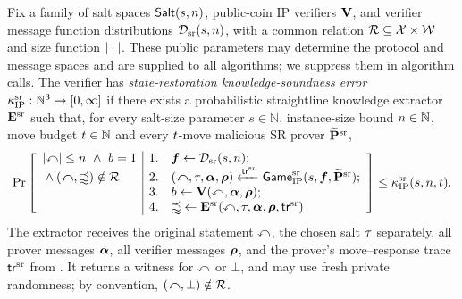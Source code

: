 \begin{definition}
  \label{def:sr_knowledge_soundness}
  Fix a family of salt spaces \(\mathsf{Salt}(s,n)\), public-coin IP verifiers \(\mathbf{V}\), and verifier message function distributions \(\mathcal{D}_{\mathrm{sr}}(s,n)\), with a common relation \(\mathcal{R}\subseteq\mathcal X\times\mathcal W\) and size function \(|\cdot|\). These public parameters may determine the protocol and message spaces and are supplied to all algorithms; we suppress them in algorithm calls. The verifier has \emph{state-restoration knowledge-soundness error} \(\kappa_{\mathrm{IP}}^{\mathrm{sr}}:\mathbb N^3\to[0,\infty]\) if there exists a probabilistic straightline knowledge extractor \(\mathbf E^{\mathrm{sr}}\) such that, for every salt-size parameter \(s\in\mathbb N\), instance-size bound \(n\in\mathbb N\), move budget \(t\in\mathbb N\) and every \(t\)-move malicious SR prover \(\widetilde{\mathbf P}^{\mathrm{sr}}\),
  \begin{equation*}
    \Pr\left[\begin{array}{l|rl}
      |\mathbb{x}|\le n\ \land\ b=1
        & 1. & \boldsymbol{f}\leftarrow\mathcal{D}_{\mathrm{sr}}(s,n);\\
      {}\land (\mathbb{x},\mathbb{w})\notin\mathcal{R}
        & 2. & (\mathbb{x},\tau,\boldsymbol{\alpha},\boldsymbol{\rho})\xleftarrow{\mathsf{tr}^{\mathrm{sr}}}
          \mathsf{Game}^{\mathrm{sr}}_{\mathrm{IP}}(s,\boldsymbol{f},\widetilde{\mathbf P}^{\mathrm{sr}});\\
        & 3. & b\leftarrow\mathbf{V}(\mathbb{x},\boldsymbol{\alpha},\boldsymbol{\rho});\\
        & 4. & \mathbb{w}\leftarrow\mathbf E^{\mathrm{sr}}
          (\mathbb{x},\tau,\boldsymbol{\alpha},\boldsymbol{\rho},\mathsf{tr}^{\mathrm{sr}})
    \end{array}\right]\le\kappa_{\mathrm{IP}}^{\mathrm{sr}}(s,n,t).
  \end{equation*}
  The extractor receives the original statement \(\mathbb{x}\), the chosen salt \(\tau\) separately, all prover messages \(\boldsymbol{\alpha}\), all verifier messages \(\boldsymbol{\rho}\), and the prover's move--response trace \(\mathsf{tr}^{\mathrm{sr}}\) from . It returns a witness for \(\mathbb{x}\) or \(\bot\), and may use fresh private randomness; by convention, \((\mathbb{x},\bot)\notin\mathcal{R}\).


\end{definition}
